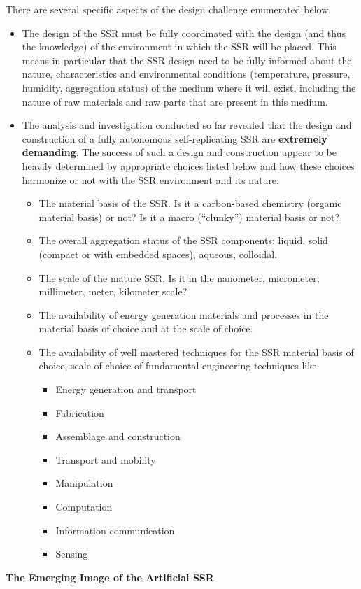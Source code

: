 \bigskip

There are several specific aspects of the design challenge enumerated
below.


\bigskip

\begin{itemize}
\item The design of the SSR must be fully coordinated with the design
(and thus the knowledge) of the environment in which the SSR will be
placed. This means in particular that the SSR design need to be fully
informed about the nature, characteristics and environmental conditions
(temperature, pressure, humidity, aggregation status) of the medium
where it will exist, including the nature of raw materials and raw
parts that are present in this medium.
\item The analysis and investigation conducted so far revealed that the
design and construction of a fully autonomous self-replicating SSR are
\textbf{extremely demanding}. The success of such a design and
construction appear to be heavily determined by appropriate choices
listed below and how these choices harmonize or not with the SSR
environment and its nature:

\begin{itemize}
\item The material basis of the SSR. Is it a carbon-based chemistry
(organic material basis) or not?  Is it a macro (“clunky”) material
basis or not?
\item The overall aggregation status of the SSR components: liquid,
solid (compact or with embedded spaces), aqueous, colloidal.
\item The scale of the mature SSR. Is it in the nanometer, micrometer,
millimeter, meter, kilometer scale?
\item The availability of energy generation materials and processes in
the material basis of choice and at the scale of choice.
\item The availability of well mastered techniques for the SSR material
basis of choice, scale of choice of fundamental engineering techniques
like:

\begin{itemize}
\item Energy generation and transport
\item Fabrication
\item Assemblage and construction
\item Transport and mobility
\item Manipulation
\item Computation
\item Information communication
\item Sensing
\end{itemize}
\end{itemize}
\end{itemize}
{\bfseries
\hypertarget{RefHeading3150306210128}{}The Emerging Image of the
Artificial SSR}

